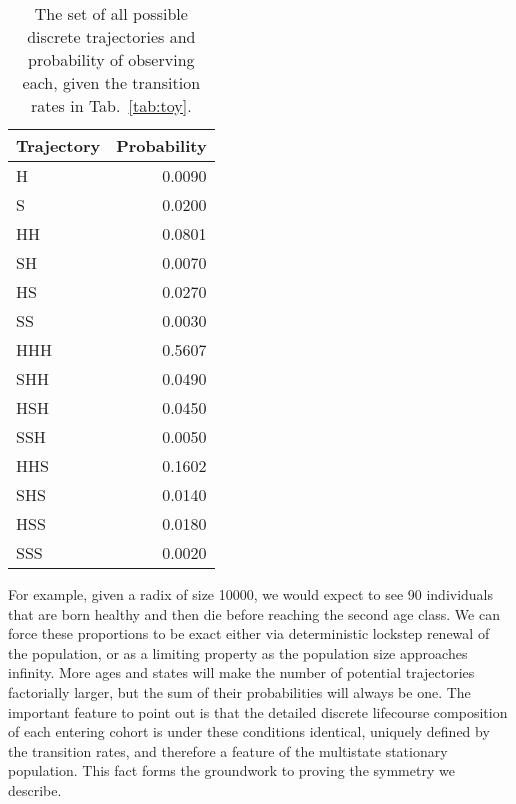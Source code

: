 \documentclass[12pt,oneside,a4paper]{article}
\theoremstyle{definition}
\begin{document}
\begin{table}[ht]
\caption{The set of all possible discrete trajectories and probability of observing each, given the transition rates in Tab.~\ref{tab:toy}. }
\label{tab:traj}
\centering
\begin{tabular}{lr}
  \hline
Trajectory & Probability \\ 
  \hline
H & 0.0090 \\ 
  S & 0.0200 \\ 
  HH & 0.0801 \\ 
  SH & 0.0070 \\ 
  HS & 0.0270 \\ 
  SS & 0.0030 \\ 
  HHH & 0.5607 \\ 
  SHH & 0.0490 \\ 
  HSH & 0.0450 \\ 
  SSH & 0.0050 \\ 
  HHS & 0.1602 \\ 
  SHS & 0.0140 \\ 
  HSS & 0.0180 \\ 
  SSS & 0.0020 \\ 
   \hline
\end{tabular}
\end{table}

For example, given a radix of size 10000, we would expect to see 90 individuals that are born healthy and then die before reaching the second age class. We can force these proportions to be exact either via deterministic lockstep renewal of the population, or as a limiting property as the population size approaches infinity. More ages and states will make the number of potential trajectories factorially larger, but the sum of their probabilities will always be one. The important feature to point out is that the detailed discrete lifecourse composition of each entering cohort is under these conditions identical, uniquely defined by the transition rates, and therefore a feature of the multistate stationary population.  This fact forms the groundwork to proving the symmetry we describe.
\end{document}
